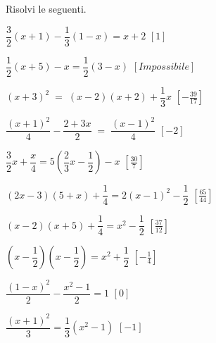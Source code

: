 \begin{esercizio}[\Ast]
\label{ese:13.36}
Risolvi le seguenti.
\begin{multicols}{2}
\begin{enumeratea}
\spazielenx
 \item \(\dfrac{3}{2}(x+1)-\dfrac{1}{3}(1-x)=x+2\) 
  \hfill \(\left[1\right]\)
 \item \(\dfrac{1}{2}(x+5)-x=\dfrac{1}{2}(3-x)\) 
  \hfill \(\left[Impossibile\right]\)
 \item \((x+3)^{2}\;=\;(x-2)(x+2)+\dfrac{1}{3}x\) 
  \hfill \(\left[-{\frac{39}{17}}\right]\)
 \item \(\dfrac{(x+1)^{2}}{4}-\dfrac{2+3x}{2}\;=\;\dfrac{(x-1)^{2}}{4}\) 
  \hfill \(\left[-2\right]\)
 \item \(\dfrac{3}{2}x+\dfrac{x}{4}=5\left(\dfrac{2}{3}x-\dfrac{1}{2}\right)-x\)
  \hfill \(\left[\frac{30}{7}\right]\)
 \item \((2x-3)(5+x)+\dfrac{1}{4}=2(x-1)^{2}-\dfrac{1}{2}\) 
  \hfill \(\left[\frac{65}{44}\right]\)
 \item \((x-2)(x+5)+\dfrac{1}{4}=x^{2}-\dfrac{1}{2}\) 
  \hfill \(\left[\frac{37}{12}\right]\)
 \item \(\left(x-\dfrac{1}{2}\right)\left(x-\dfrac{1}{2}\right)=
        x^{2}+\dfrac{1}{2}\) \hfill \(\left[-{\frac{1}{4}}\right]\)
 \item \(\dfrac{(1-x)^{2}}{2}-\dfrac{x^{2}-1}{2}=1\) \hfill \(\left[0\right]\)
 \item \(\dfrac{(x+1)^{2}}{3}=\dfrac{1}{3}(x^{2}-1)\) \hfill \(\left[-1\right]\)
\end{enumeratea}
\end{multicols}
\end{esercizio}

